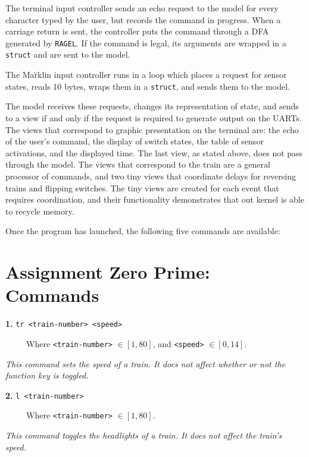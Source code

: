 \documentclass{article}
\begin{document}
The terminal input controller sends an echo request to the model for every character typed by the user, but records the command in progress. When a carriage return is sent, the controller puts the command through a DFA generated by \texttt{RAGEL}. If the command is legal, its arguments are wrapped in a \texttt{struct} and are sent to the model.

The Ma\"rklin input controller runs in a loop which places a request for sensor states, reads 10 bytes, wraps them in a \texttt{struct}, and sends them to the model.

The model receives these requests, changes its representation of state, and sends to a view if and only if the request is required to generate output on the UARTs. The views that correspond to graphic presentation on the terminal are: the echo of the user's command, the display of switch states, the table of sensor activations, and the displayed time. The last view, as stated above, does not pass through the model. The views that correspond to the train are a general processor of commands, and two tiny views that coordinate delays for reversing trains and flipping switches. The tiny views are created for each event that requires coordination, and their functionality demonstrates that out kernel is able to recycle memory.

Once the program has launched, the following five commands are available:

\section*{Assignment Zero Prime: Commands}

\vspace{0.3cm}
\textbf{1.} \texttt{tr <train-number> <speed>}

\ \ \ \ \ Where \texttt{<train-number>} $\in [1,80]$, and \texttt{<speed>} $\in [0,14]$.

\vspace{0.3cm}
\textit{This command sets the speed of a train. It does not affect whether or not the function key is toggled.}

\vspace{0.5cm}
\textbf{2.} \texttt{l <train-number>}

\ \ \ \ \ Where \texttt{<train-number>} $\in [1,80]$.

\vspace{0.3cm}
\textit{This command toggles the headlights of a train. It does not affect the train's speed.}
\end{document}
